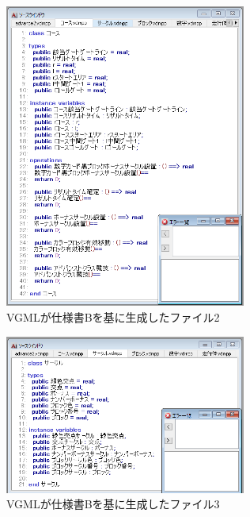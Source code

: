 \begin{figure}[p]
    \begin{center}
    \includegraphics[width=300]{image/indicationB_vdm2.PNG}
    \caption{VGMLが仕様書Bを基に生成したファイル2}
    \label{fig:indicationB_vdm2}
    \end{center}
\end{figure}

\begin{figure}[p]
    \begin{center}
    \includegraphics[width=300]{image/indicationB_vdm3.PNG}
    \caption{VGMLが仕様書Bを基に生成したファイル3}
    \label{fig:indicationB_vdm3}
    \end{center}
\end{figure}

